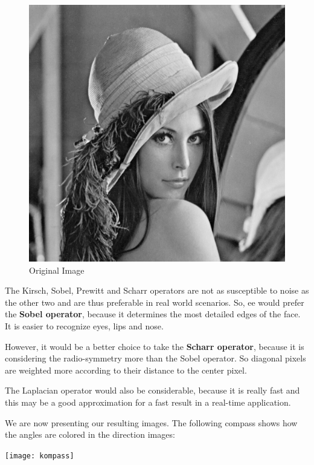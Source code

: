 \documentclass[a4paper,12pt]{article}
\begin{document}
	\begin{figure}
		\includegraphics[width=\colwidth]{lena}\\
		Original Image
	\end{figure}
	
	The Kirsch, Sobel, Prewitt and Scharr operators are not as susceptible to noise as the other two and are thus preferable in real world scenarios. So, ee would prefer the \textbf{Sobel operator}, because it determines the most detailed edges of the face. It is easier to recognize eyes, lips and nose.
	
	However, it would be a better choice to take the \textbf{Scharr operator}, because it is considering the radio-symmetry more than the Sobel operator. So diagonal pixels are weighted more according to their distance to the center pixel.
	
	The Laplacian operator would also be considerable, because it is really fast and this may be a good approximation for a fast result in a real-time application.
	
	We are now presenting our resulting images. The following compass shows how the angles are colored in the direction images: \quad
	
	\texttt{[image: kompass]}
%		
\newpage
\end{document}
